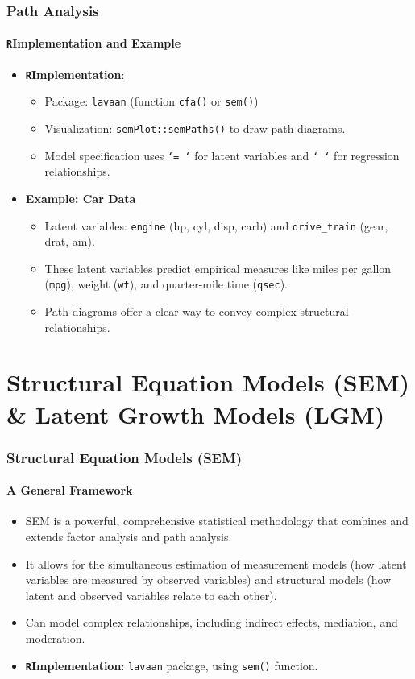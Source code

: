 \documentclass{beamer}
\newcommand{\R}{\texttt{R}}
\newcommand{\code}[1]{\texttt{#1}}
\begin{document}
\begin{frame}
    \frametitle{Path Analysis}
    \framesubtitle{\R Implementation and Example}
    \begin{itemize}
        \item \textbf{\R Implementation}:
            \begin{itemize}
                \item Package: \code{lavaan} (function \code{cfa()} or \code{sem()})
                \item Visualization: \code{semPlot::semPaths()} to draw path diagrams.
                \item Model specification uses \code{`=~`} for latent variables and \code{`~`} for regression relationships.
            \end{itemize}
        \item \textbf{Example: Car Data}
            \begin{itemize}
                \item Latent variables: \code{engine} (hp, cyl, disp, carb) and \code{drive\_train} (gear, drat, am).
                \item These latent variables predict empirical measures like miles per gallon (\code{mpg}), weight (\code{wt}), and quarter-mile time (\code{qsec}).
                \item Path diagrams offer a clear way to convey complex structural relationships.
            \end{itemize}
    \end{itemize}
\end{frame}

\section{Structural Equation Models (SEM) \& Latent Growth Models (LGM)}

\begin{frame}
    \frametitle{Structural Equation Models (SEM)}
    \framesubtitle{A General Framework}
    \begin{itemize}
        \item SEM is a powerful, comprehensive statistical methodology that combines and extends factor analysis and path analysis.
        \item It allows for the simultaneous estimation of measurement models (how latent variables are measured by observed variables) and structural models (how latent and observed variables relate to each other).
        \item Can model complex relationships, including indirect effects, mediation, and moderation.
        \item \textbf{\R Implementation}: \code{lavaan} package, using \code{sem()} function.
    \end{itemize}
\end{frame}
\end{document}
